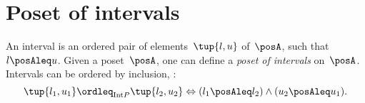 

\section{Poset of intervals}
\begin{definition}
  \label{def:poset_intervals}
  An interval is an ordered pair of elements~$\tup{l,u}$ of~$\posA$, such that~$l\posAleq u$. Given a poset~$\posA$, one can define a \emph{poset of intervals} on~$\posA$. Intervals can be ordered by inclusion, \eg :
  \begin{equation*}
    \tup{l_1,u_1}\ordleq_{\mathrm{Int} P}\tup{l_2,u_2} \Leftrightarrow (l_1\posAleq l_2)\wedge (u_2\posAleq u_1).
  \end{equation*}
\end{definition}
